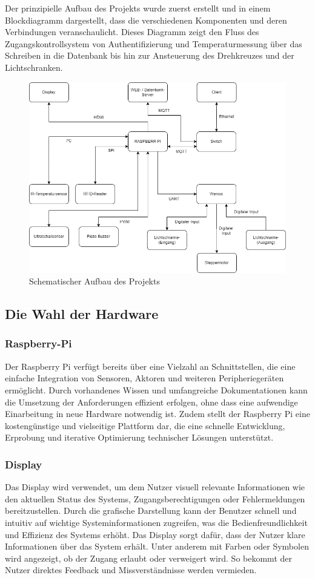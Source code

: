 Der prinzipielle Aufbau des Projekts wurde zuerst erstellt und in einem Blockdiagramm dargestellt, dass die verschiedenen Komponenten und deren Verbindungen veranschaulicht. Dieses Diagramm zeigt den Fluss des Zugangskontrollsystem von Authentifizierung und Temperaturmessung über das Schreiben in die Datenbank bis hin zur Ansteuerung des Drehkreuzes und der Lichtschranken.

\begin{figure}[h]
	\centering
	\includegraphics[width=0.4\linewidth]{figures/Prinzipienschaltbild.png}
	\caption[Prinzipienschaltbild]{Schematischer Aufbau des Projekts}\label{fig:prinzipienschaltbild}
\end{figure}


\subsection{Die Wahl der Hardware}\label{subsec:die_wahl_der_hardware}

\subsubsection{Raspberry-Pi}

Der Raspberry Pi verfügt bereits über eine Vielzahl an Schnittstellen, die eine einfache Integration von Sensoren, Aktoren und weiteren Peripheriegeräten ermöglicht. Durch vorhandenes Wissen und umfangreiche Dokumentationen kann die Umsetzung der Anforderungen effizient erfolgen, ohne dass eine aufwendige Einarbeitung in neue Hardware notwendig ist. Zudem stellt der Raspberry Pi eine kostengünstige und vielseitige Plattform dar, die eine schnelle Entwicklung, Erprobung und iterative Optimierung technischer Lösungen unterstützt.

\subsubsection{Display}

Das Display wird verwendet, um dem Nutzer visuell relevante Informationen wie den aktuellen Status des Systems, Zugangsberechtigungen oder Fehlermeldungen bereitzustellen. Durch die grafische Darstellung kann der Benutzer schnell und intuitiv auf wichtige Systeminformationen zugreifen, was die Bedienfreundlichkeit und Effizienz des Systems erhöht. Das Display sorgt dafür, dass der Nutzer klare Informationen über das System erhält. Unter anderem mit Farben oder Symbolen wird angezeigt, ob der Zugang erlaubt oder verweigert wird. So bekommt der Nutzer direktes Feedback und Missverständnisse werden vermieden.

